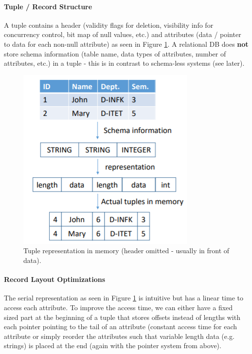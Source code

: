 \paragraph{Tuple / Record Structure}
A tuple contains a header (validity flags for deletion, visibility info for concurrency control, bit map of null values, etc.) and attributes (data / pointer to data for each non-null attribute) as seen in Figure \ref{fig:tuple}. A relational DB does \textbf{not} store schema information (table name, data types of attributes, number of attributes, etc.) in a tuple - this is in contrast to schema-less systems (see later). %

\begin{figure}[h]
	\centering
	\includegraphics[scale=0.6]{images/2-tuple.PNG}
	\caption{Tuple representation in memory (header omitted - usually in front of data).}
	\label{fig:tuple}
\end{figure}

\paragraph{Record Layout Optimizations}
The serial representation as seen in Figure \ref{fig:tuple} is intuitive but has a linear time to access each attribute. To improve the access time, we can either have a fixed sized part at the beginning of a tuple that stores offsets instead of lengths with each pointer pointing to the tail of an attribute (constant access time for each attribute or simply reorder the attributes such that variable length data (e.g. strings) is placed at the end (again with the pointer system from above). %

